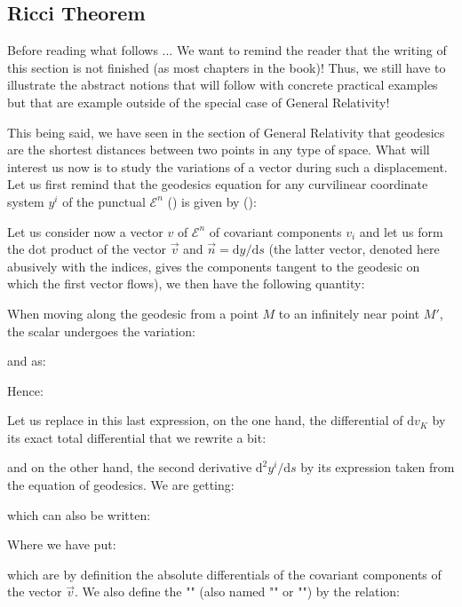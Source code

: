 	\subsection{Ricci Theorem}
	\begin{tcolorbox}[colback=red!5,borderline={1mm}{2mm}{red!5},arc=0mm,boxrule=0pt]
	\bcbombe Before reading what follows ... We want to remind the reader that the writing of this section is not finished (as most chapters in the book)! Thus, we still have to illustrate the abstract notions that will follow with concrete practical examples but that are example outside of the special case of General Relativity!
	\end{tcolorbox}
	This being said, we have seen in the section of General Relativity that geodesics are the shortest distances between two points in any type of space. What will interest us now is to study the variations of a vector during such a displacement. Let us first remind that the geodesics equation for any curvilinear coordinate system $y^i$ of the punctual $\mathcal{E}^n$ () is given by ():
	
	Let us consider now a vector $v$ of $\mathcal{E}^n$ of covariant components $v_i$ and let us form the dot product of the vector $\vec{v}$ and $\vec{n}=\mathrm{d}y/\mathrm{d}s$ (the latter vector, denoted here abusively with the indices, gives the components tangent to the geodesic on which the first vector flows), we then have the following quantity:
	
	When moving along the geodesic from a point $M$ to an infinitely near point $M'$, the scalar undergoes the variation:
	
	and as:
	
	Hence:
	
	Let us replace in this last expression, on the one hand, the differential of $\mathrm{d}v_K$ by its exact total differential that we rewrite a bit:
	
	and on the other hand, the second derivative $\mathrm{d}^2y^i/\mathrm{d}s$ by its expression taken from the equation of geodesics. We are getting:
	
	which can also be written:
	
	Where we have put:
	
	which are by definition the absolute differentials of the covariant components of the vector $\vec{v}$. We also define the "" (also named "" or "") by the relation:
	
